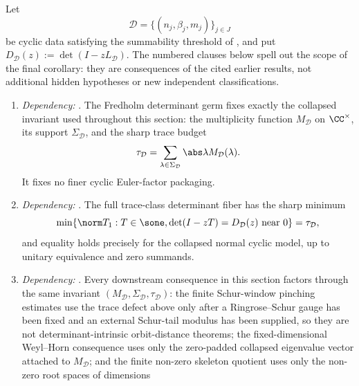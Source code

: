 \begin{remark}
  Let
  \[
    \mathcal D=\{(n_j,\beta_j,m_j)\}_{j\in J}
  \]
  be cyclic data satisfying the summability threshold of
  , and put
  \(D_{\mathcal D}(z):=\det(I-zL_{\mathcal D})\). The numbered clauses below
  spell out the scope of the final corollary: they are consequences of the
  cited earlier results, not additional hidden hypotheses or new independent
  classifications.
  \begin{enumerate}[label=\textup{(\roman*)},leftmargin=1.7em]
    \item \emph{Dependency:}
    .
    The Fredholm determinant germ fixes exactly the collapsed invariant
    used throughout this section: the multiplicity function
    \(M_{\mathcal D}\) on \(\CC^\times\), its support
    \(\Sigma_{\mathcal D}\), and the sharp trace budget
  \[
    \tau_{\mathcal D}
    =\sum_{\lambda\in\Sigma_{\mathcal D}}
      \abs\lambda M_{\mathcal D}(\lambda).
  \]
    It fixes no finer cyclic Euler-factor packaging.
    \item \emph{Dependency:}
    .
    The full trace-class determinant fiber has the sharp minimum
    \[
      \min\{\norm T_1:T\in\sone,
      \det(I-zT)=D_{\mathcal D}(z)\text{ near }0\}
      =\tau_{\mathcal D},
    \]
    and equality holds precisely for the collapsed normal cyclic model, up to
    unitary equivalence and zero summands.
    \item \emph{Dependency:}
    .
Every downstream consequence in this section factors through the same
    invariant \((M_{\mathcal D},\Sigma_{\mathcal D},\tau_{\mathcal D})\):
    the finite Schur-window pinching estimates use the trace defect above only after a
    Ringrose--Schur gauge has been fixed and an external Schur-tail modulus has
    been supplied, so they are not determinant-intrinsic orbit-distance
    theorems; the fixed-dimensional
Weyl--Horn consequence uses only the zero-padded collapsed eigenvalue vector
    attached to \(M_{\mathcal D}\); and the finite non-zero skeleton quotient
    uses only the non-zero root spaces of dimensions

\end{enumerate}
\end{remark}
